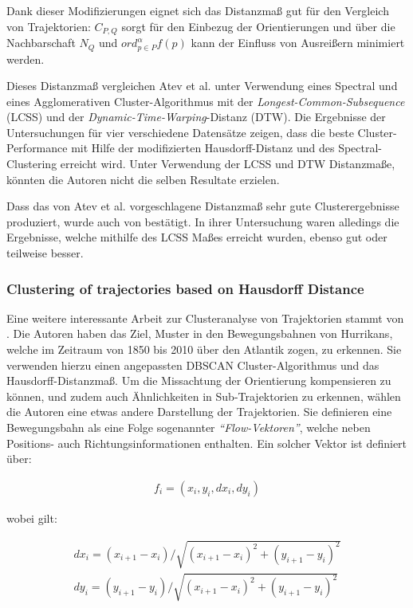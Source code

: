 Dank dieser Modifizierungen eignet sich das Distanzmaß gut für den Vergleich von Trajektorien:
$C_{P,Q}$ sorgt für den Einbezug der Orientierungen und über die Nachbarschaft $N_Q$ und $ord_{p \in P}^{\alpha} f(p)$
kann der Einfluss von Ausreißern minimiert werden.

Dieses Distanzmaß vergleichen Atev et al. unter Verwendung eines Spectral und eines Agglomerativen
Cluster-Algorithmus mit der \textit{Longest-Common-Subsequence} (LCSS) und der \textit{Dynamic-Time-Warping}-Distanz (DTW).
Die Ergebnisse der Untersuchungen für vier verschiedene Datensätze zeigen, dass die beste Cluster-Performance
mit Hilfe der modifizierten Hausdorff-Distanz und des Spectral-Clustering erreicht wird.
Unter Verwendung der LCSS und DTW Distanzmaße, könnten die Autoren nicht die selben Resultate erzielen.

Dass das von Atev et al. vorgeschlagene Distanzmaß sehr gute Clusterergebnisse produziert, wurde auch von \cite[]{Morris2009}
bestätigt. In ihrer Untersuchung waren alledings die Ergebnisse, welche mithilfe des LCSS Maßes erreicht wurden,
ebenso gut oder teilweise besser.

\subsubsection*{Clustering of trajectories based on Hausdorff Distance}
Eine weitere interessante Arbeit zur Clusteranalyse von Trajektorien stammt von \cite[]{Chen2011}.
Die Autoren haben das Ziel, Muster in den Bewegungsbahnen von Hurrikans, welche im Zeitraum von 1850 bis 2010
über den Atlantik zogen, zu erkennen.
Sie verwenden hierzu einen angepassten DBSCAN Cluster-Algorithmus und das Hausdorff-Distanzmaß.
Um die Missachtung der Orientierung kompensieren zu können, und zudem auch Ähnlichkeiten
in Sub-Trajektorien zu erkennen, wählen die Autoren eine etwas andere Darstellung der Trajektorien.
Sie definieren eine Bewegungsbahn als eine Folge sogenannter \textit{``Flow-Vektoren''}, welche neben
Positions- auch Richtungsinformationen enthalten. Ein solcher Vektor ist definiert über:

\begin{ceqn}
\begin{align}
    f_i = (x_i, y_i, dx_i, dy_i)
\end{align}
\end{ceqn}

wobei gilt:

\begin{ceqn}
\begin{align}
    dx_i = (x_{i+1} - x_i)/\sqrt{(x_{i+1} - x_i)^2 + (y_{i+1} - y_i)^2} \\
    dy_i = (y_{i+1} - y_i)/\sqrt{(x_{i+1} - x_i)^2 + (y_{i+1} - y_i)^2}
\end{align}
\end{ceqn}

